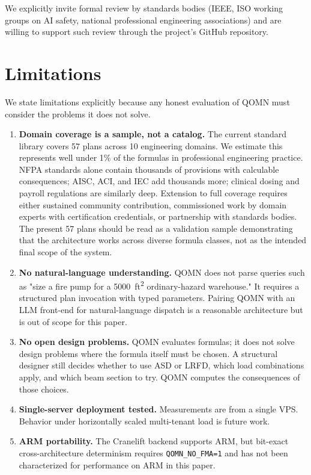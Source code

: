 \documentclass[11pt,a4paper]{article}
\begin{document}
We explicitly invite formal review by standards bodies (IEEE, ISO working groups on AI safety, national professional engineering associations) and are willing to support such review through the project's GitHub repository.

\section{Limitations}
\label{sec:limits}

We state limitations explicitly because any honest evaluation of QOMN must consider the problems it does not solve.

\begin{enumerate}[leftmargin=*]
\item \textbf{Domain coverage is a sample, not a catalog.} The current standard library covers 57 plans across 10 engineering domains. We estimate this represents well under 1\% of the formulas in professional engineering practice. NFPA standards alone contain thousands of provisions with calculable consequences; AISC, ACI, and IEC add thousands more; clinical dosing and payroll regulations are similarly deep. Extension to full coverage requires either sustained community contribution, commissioned work by domain experts with certification credentials, or partnership with standards bodies. The present 57 plans should be read as a validation sample demonstrating that the architecture works across diverse formula classes, not as the intended final scope of the system.
\item \textbf{No natural-language understanding.} QOMN does not parse queries such as "size a fire pump for a 5000~ft\textsuperscript{2} ordinary-hazard warehouse." It requires a structured plan invocation with typed parameters. Pairing QOMN with an LLM front-end for natural-language dispatch is a reasonable architecture but is out of scope for this paper.
\item \textbf{No open design problems.} QOMN evaluates formulas; it does not solve design problems where the formula itself must be chosen. A structural designer still decides whether to use ASD or LRFD, which load combinations apply, and which beam section to try. QOMN computes the consequences of those choices.
\item \textbf{Single-server deployment tested.} Measurements are from a single VPS. Behavior under horizontally scaled multi-tenant load is future work.
\item \textbf{ARM portability.} The Cranelift backend supports ARM, but bit-exact cross-architecture determinism requires \texttt{QOMN\_NO\_FMA=1} and has not been characterized for performance on ARM in this paper.

\end{enumerate}
\end{document}
